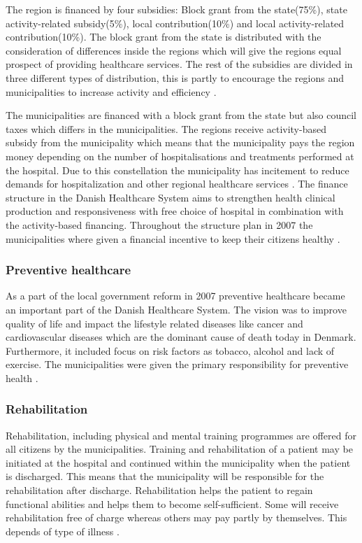 The region is financed by four subsidies: Block grant from the state(75\%), state activity-related subsidy(5\%), local contribution(10\%) and local activity-related contribution(10\%). The block grant from the state is distributed with the consideration of differences inside the regions which will give the regions equal prospect of providing healthcare services. The rest of the subsidies are divided in three different types of distribution, this is partly to encourage the regions and municipalities to increase activity and efficiency \cite{sundhedsministeriet}.

The municipalities are financed with a block grant from the state but also council taxes which differs in the municipalities. The regions receive activity-based subsidy from the municipality which means that the municipality pays the region money depending on the number of hospitalisations and treatments performed at the hospital. Due to this constellation the municipality has incitement to reduce demands for hospitalization and other regional healthcare services \cite{Healthcareindk2}.
The finance structure in the Danish Healthcare System aims to strengthen health clinical production and responsiveness with free choice of hospital in combination with the activity-based financing. Throughout the structure plan in 2007 the municipalities where given a financial incentive to keep their citizens healthy \cite{DKhealthreview}.



\subsubsection{Preventive healthcare}

As a part of the local government reform in 2007 preventive healthcare became an important part of the Danish Healthcare System. The vision was to improve quality of life and impact the lifestyle related diseases like cancer and cardiovascular diseases which are the dominant cause of death today in Denmark. Furthermore, it included focus on risk factors as tobacco, alcohol and lack of exercise. The municipalities were given the primary responsibility for preventive health \cite{sundhedsministeriet}.

\subsubsection{Rehabilitation}

Rehabilitation, including physical and mental training programmes are offered for all citizens by the municipalities. Training and rehabilitation of a patient may be initiated at the hospital and continued within the municipality when the patient is discharged. This means that the municipality will be responsible for the rehabilitation after discharge. Rehabilitation helps the patient to regain functional abilities and helps them to become self-sufficient. Some will receive rehabilitation free of charge whereas others may pay partly by themselves. This depends of type of illness \cite{Healthcareindk2, retningsrehab, WHO}.
 


